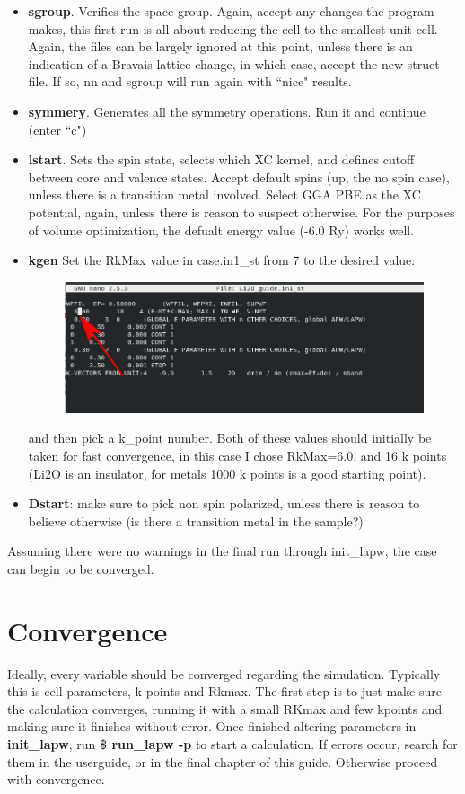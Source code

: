 \documentclass[12pt]{article}
\begin{document}
\begin{itemize}
	\item \textbf{sgroup}. Verifies the space group.  Again, accept any changes the program makes, this first run is all about reducing the cell to the smallest unit cell. Again, the files can be largely  ignored at this point, unless there is an indication of a Bravais lattice change, in which case, accept the new struct file. If so, nn and sgroup will run again with ``nice" results.  
	\item  \textbf{symmery}. Generates all the symmetry operations. Run it and continue (enter ``c")
	\item  \textbf{lstart}. Sets the spin state, selects which XC kernel, and defines cutoff between core and valence states.  Accept default spins (up, the no spin case), unless there is a transition metal involved. Select GGA PBE as the XC potential, again, unless there is reason to suspect otherwise. For the purposes of volume optimization, the defualt energy value (-6.0 Ry) works well.
		\item \textbf{kgen} Set the RkMax value in case.in1\_st from 7 to the desired value:		
	\begin{figure}[H]
		\includegraphics[scale=0.4]{./images/init_lapw3.png}
	\end{figure}
	and then pick a k\_point number.  Both of these values should initially be taken for fast convergence, in this case I chose RkMax=6.0, and 16 k points (Li2O is an insulator, for metals 1000 k points is a good starting point).
	\item \textbf{Dstart}: make sure to pick non spin polarized, unless there is reason to believe otherwise (is there a transition metal in the sample?)
	


\end{itemize}

Assuming there were no warnings in the final run through init\_lapw, the case can begin to be converged.

\section{Convergence}
Ideally, every variable should be converged regarding the simulation.  Typically this is cell parameters, k points and Rkmax.  The first step is to just make sure the calculation converges, running it with a small RKmax and few kpoints and making sure it finishes without error.  Once finished altering parameters in \textbf{init\_lapw}, run \textbf{\$ run\_lapw -p} to start a calculation.  If errors occur, search for them in  the userguide, or in the final chapter of this guide.  Otherwise proceed with convergence.  
\end{document}
